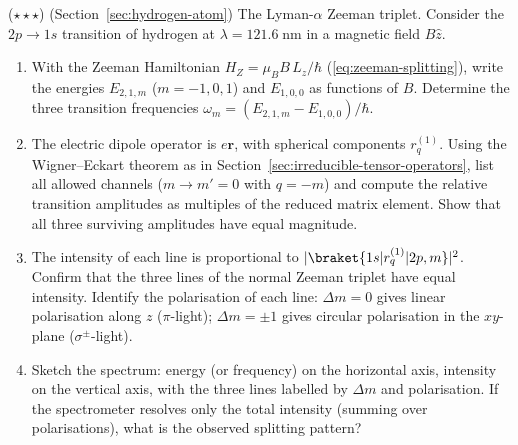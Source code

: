\begin{problemset}
\item ($\star\star\star$) (Section~\ref{sec:hydrogen-atom}) The Lyman-$\alpha$ Zeeman triplet. Consider the $2p \to 1s$ transition of hydrogen at $\lambda = 121.6\;\text{nm}$ in a magnetic field $B\hat{z}$.
\begin{enumerate}
\item[(a)] With the Zeeman Hamiltonian $H_Z = \mu_B B\,L_z/\hbar$ (\eqref{eq:zeeman-splitting}), write the energies $E_{2,1,m}$ ($m = -1,0,1$) and $E_{1,0,0}$ as functions of $B$. Determine the three transition frequencies $\omega_m = (E_{2,1,m} - E_{1,0,0})/\hbar$.
\item[(b)] The electric dipole operator is $e\bm r$, with spherical components $r^{(1)}_q$. Using the Wigner--Eckart theorem as in Section~\ref{sec:irreducible-tensor-operators}, list all allowed channels ($m\to m'=0$ with $q = -m$) and compute the relative transition amplitudes as multiples of the reduced matrix element. Show that all three surviving amplitudes have equal magnitude.
\item[(c)] The intensity of each line is proportional to $|\braket{1s|r^{(1)}_q|2p,m}|^2$. Confirm that the three lines of the normal Zeeman triplet have equal intensity. Identify the polarisation of each line: $\Delta m = 0$ gives linear polarisation along $z$ ($\pi$-light); $\Delta m = \pm1$ gives circular polarisation in the $xy$-plane ($\sigma^\pm$-light).
\item[(d)] Sketch the spectrum: energy (or frequency) on the horizontal axis, intensity on the vertical axis, with the three lines labelled by $\Delta m$ and polarisation. If the spectrometer resolves only the total intensity (summing over polarisations), what is the observed splitting pattern?
\end{enumerate}

\end{problemset}

